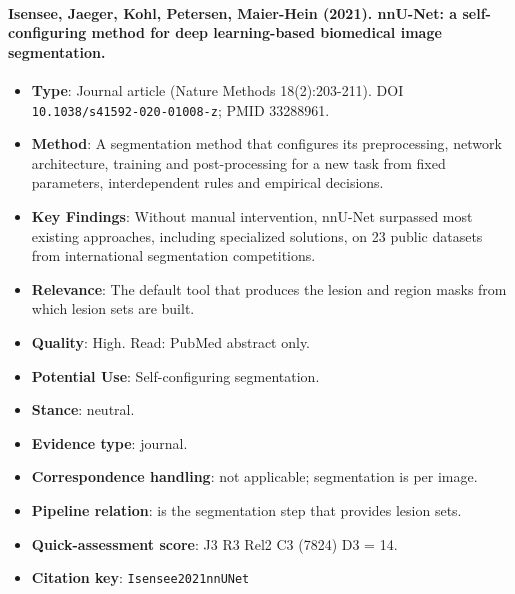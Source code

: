 \documentclass[journal,onecolumn]{IEEEtran}
\begin{document}
\paragraph{Isensee, Jaeger, Kohl, Petersen, Maier-Hein (2021). nnU-Net: a self-configuring method for deep learning-based biomedical image segmentation.~\cite{Isensee2021nnUNet}}\mbox{}

\begin{itemize}

\item{} \textbf{Type}: Journal article (Nature Methods 18(2):203-211). DOI \nolinkurl{10.1038/s41592-020-01008-z}; PMID 33288961.

\item{} \textbf{Method}: A segmentation method that configures its preprocessing, network architecture, training and post-processing for a new task from fixed parameters, interdependent rules and empirical decisions.

\item{} \textbf{Key Findings}: Without manual intervention, nnU-Net surpassed most existing approaches, including specialized solutions, on 23 public datasets from international segmentation competitions.

\item{} \textbf{Relevance}: The default tool that produces the lesion and region masks from which lesion sets are built.

\item{} \textbf{Quality}: High. Read: PubMed abstract only.

\item{} \textbf{Potential Use}: Self-configuring segmentation.

\item{} \textbf{Stance}: neutral.

\item{} \textbf{Evidence type}: journal.

\item{} \textbf{Correspondence handling}: not applicable; segmentation is per image.

\item{} \textbf{Pipeline relation}: is the segmentation step that provides lesion sets.

\item{} \textbf{Quick-assessment score}: J3 R3 Rel2 C3 (7824) D3 = 14.

\item{} \textbf{Citation key}: \texttt{Isensee2021nnUNet}

\end{itemize}
\end{document}
